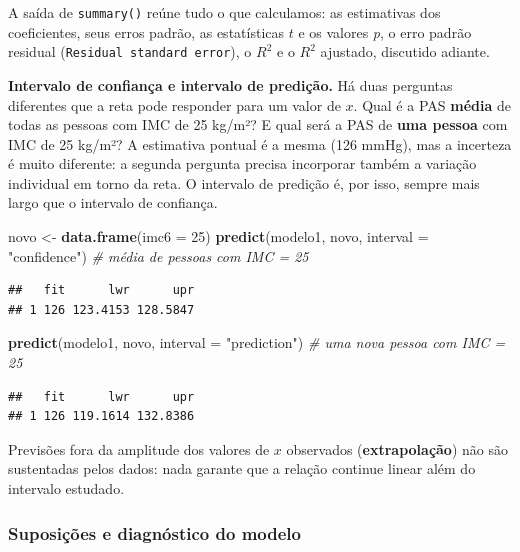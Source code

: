 \documentclass[
]{book}
\newenvironment{Shaded}{\begin{snugshade}}{\end{snugshade}}
\newcommand{\AttributeTok}[1]{\textcolor[rgb]{0.13,0.29,0.53}{#1}}
\newcommand{\CommentTok}[1]{\textcolor[rgb]{0.56,0.35,0.01}{\textit{#1}}}
\newcommand{\DecValTok}[1]{\textcolor[rgb]{0.00,0.00,0.81}{#1}}
\newcommand{\FunctionTok}[1]{\textcolor[rgb]{0.13,0.29,0.53}{\textbf{#1}}}
\newcommand{\NormalTok}[1]{#1}
\newcommand{\OtherTok}[1]{\textcolor[rgb]{0.56,0.35,0.01}{#1}}
\newcommand{\StringTok}[1]{\textcolor[rgb]{0.31,0.60,0.02}{#1}}
\begin{document}
A saída de \texttt{summary()} reúne tudo o que calculamos: as estimativas dos coeficientes, seus erros padrão, as estatísticas \(t\) e os valores \emph{p}, o erro padrão residual (\texttt{Residual\ standard\ error}), o \(R^2\) e o \(R^2\) ajustado, discutido adiante.

\textbf{Intervalo de confiança e intervalo de predição.} Há duas perguntas diferentes que a reta pode responder para um valor de \(x\). Qual é a PAS \textbf{média} de todas as pessoas com IMC de 25 kg/m²? E qual será a PAS de \textbf{uma pessoa} com IMC de 25 kg/m²? A estimativa pontual é a mesma (126 mmHg), mas a incerteza é muito diferente: a segunda pergunta precisa incorporar também a variação individual em torno da reta. O intervalo de predição é, por isso, sempre mais largo que o intervalo de confiança.

\begin{Shaded}
\begin{Highlighting}[]
\NormalTok{novo }\OtherTok{\textless{}{-}} \FunctionTok{data.frame}\NormalTok{(}\AttributeTok{imc6 =} \DecValTok{25}\NormalTok{)}
\FunctionTok{predict}\NormalTok{(modelo1, novo, }\AttributeTok{interval =} \StringTok{"confidence"}\NormalTok{)   }\CommentTok{\# média de pessoas com IMC = 25}
\end{Highlighting}
\end{Shaded}

\begin{verbatim}
##   fit      lwr      upr
## 1 126 123.4153 128.5847
\end{verbatim}

\begin{Shaded}
\begin{Highlighting}[]
\FunctionTok{predict}\NormalTok{(modelo1, novo, }\AttributeTok{interval =} \StringTok{"prediction"}\NormalTok{)   }\CommentTok{\# uma nova pessoa com IMC = 25}
\end{Highlighting}
\end{Shaded}

\begin{verbatim}
##   fit      lwr      upr
## 1 126 119.1614 132.8386
\end{verbatim}

Previsões fora da amplitude dos valores de \(x\) observados (\textbf{extrapolação}) não são sustentadas pelos dados: nada garante que a relação continue linear além do intervalo estudado.

\subsubsection{Suposições e diagnóstico do modelo}\label{suposiuxe7uxf5es-e-diagnuxf3stico-do-modelo}
\end{document}
